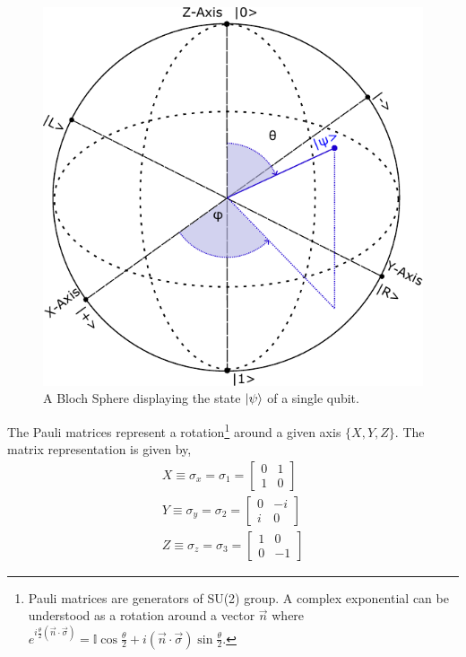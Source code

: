 \begin{figure}[h]
    \centering
    \includegraphics[scale=0.8]{Figures/BlochSphere.pdf}
    \caption{A Bloch Sphere displaying the state $\ket{\psi}$ of a single qubit.}
    \label{fig:bloch_sphere}
\end{figure}
The Pauli matrices represent a rotation\footnote{Pauli matrices are generators of SU(2) group. A complex exponential can be understood as a rotation around a vector $\vec{n}$ where $e^{i\frac{\theta}{2}(\vec{n}\cdot \vec{\sigma})} = \mathbb{I}\cos{\frac{\theta}{2}} + i(\vec{n}\cdot \vec{\sigma})\sin{\frac{\theta}{2}}$.} around a given axis $\{X, Y, Z \}$. The matrix representation is given by,
\begin{align*}
X \equiv \sigma_{x} = \sigma_{1} = 
    \begin{bmatrix}
           0 & 1 \\
           1 & 0 
         \end{bmatrix} \\
Y \equiv \sigma_{y} = \sigma_{2} = 
    \begin{bmatrix}
           0 & -i \\
           i & 0 
         \end{bmatrix} \\ 
Z \equiv \sigma_{z} = \sigma_{3} = 
    \begin{bmatrix}
           1 & 0 \\
           0 & -1 
         \end{bmatrix}
\end{align*}
